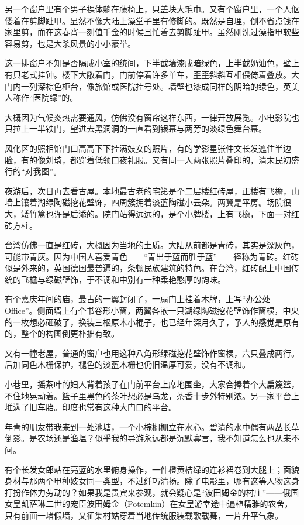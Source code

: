 \par 另一个窗户里有个男子裸体躺在藤椅上，只盖块大毛巾。又有个窗户里，一个人伛偻着在剪脚趾甲。显然不像大陆上澡堂子里有修脚的。既然是自理，倒不省点钱在家里剪，而在这春宵一刻值千金的时候且忙着去剪脚趾甲。虽然刚洗过澡指甲软些容易剪，也是大杀风景的小小豪举。
\par 这一排窗户不知是否隔成小室的统间，下半截墙漆成暗绿色，上半截奶油色，壁上有只老式挂钟。楼下大敞着门，门前停着许多单车，歪歪斜斜互相偎倚着叠放。大门内一列深棕色柜台，像旅馆或医院挂号处。墙壁也漆成同样的阴暗的绿色，英美人称作“医院绿”的。
\par 大概因为气候炎热需要通风，仿佛没有窗帘这样东西，一律开放展览。小电影院也只拉上一半铁门，望进去黑洞洞的一直看到银幕与两旁的淡绿色舞台幕。
\par 风化区的照相馆门口高高下下挂满妓女的照片，有的学影星张仲文长发遮住半边脸，有的像刘琦，都穿着低领口夜礼服。又有同一人两张照片叠印的，清末民初盛行的“对我图”。
\par 夜游后，次日再去看古屋。本地最古老的宅第是个二层楼红砖屋，正楼有飞檐，山墙上镶着湖绿陶磁挖花壁饰，四周簇拥着淡蓝陶磁小云朵。两翼是平房。场院很大，矮竹篱也许是后添的。院门站得远远的，是个小牌楼，上有飞檐，下面一对红砖方柱。
\par 台湾仿佛一直是红砖，大概因为当地的土质。大陆从前都是青砖，其实是深灰色，可能带青灰。因为中国人喜爱青色——“青出于蓝而胜于蓝”——径称为青砖。红砖似是外来的，英国德国最普遍的，条顿民族建筑的特色。在台湾，红砖配上中国传统的飞檐与绿磁壁饰，于不调和中别有一种柔艳憨厚的韵味。
\par 有个嘉庆年间的庙，最古的一翼封闭了，一扇门上挂着木牌，上写“办公处Office”。侧面墙上有个书卷形小窗，两翼各嵌一只湖绿陶磁挖花壁饰作窗棂，中央的一枚想必砸破了，换装三根原木小棍子，也已经年深月久了，予人的感觉是原有的，整个的构图倒更朴拙有致。
\par 又有一幢老屋，普通的窗户也用这种八角形绿磁挖花壁饰作窗棂，六只叠成两行。后加同色木栅保护，褪色的淡蓝木栅也仍旧温厚可爱，没有不调和。
\par 小巷里，摇茶叶的妇人背着孩子在门前平台上席地围坐，大家合捧着个大扁篾篮，不住地晃动着。篮子里黑色的茶叶想必是乌龙，茶香十步外特别浓。另一家平台上堆满了旧车胎。印度也常有这种大门口的平台。
\par 年青的朋友带我来到一处池塘，一个小棕榈棚立在水心。碧清的水中偶有两丛长草倒影。是农场还是渔塭？似乎我的导游永远都是沉默寡言，我不知道怎么也从来不问。
\par 有个长发女郎站在亮蓝的水里俯身操作，一件橙黄桔绿的连衫裙卷到大腿上；面貌身材与那两个甲种妓女同一类型，不过纤巧清扬。除了电影里，哪有这等人物这身打扮作体力劳动的？如果我是贵宾来参观，就会疑心是“波田姆金的村庄”——俄国女皇凯萨琳二世的宠臣波田姆金（Potemkin）在女皇游幸途中遍植精雅的农舍，只有前面一堵假墙，又征集村姑穿着当地传统服装载歌载舞，一片升平气象。
